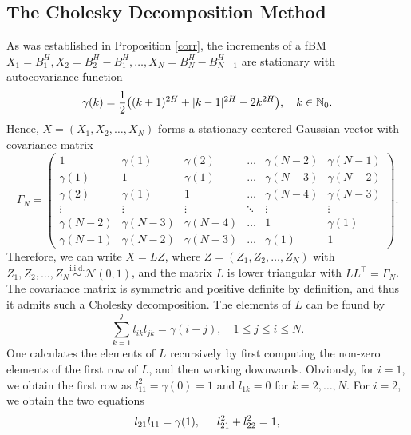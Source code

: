 \subsection{The Cholesky Decomposition Method}
As was established in Proposition \ref{corr}, the increments of a fBM $X_{1}=B_{1}^{H},X_{2}=B_{2}^{H}-B_{1}^{H}, \dots, X_{N}=B_{N}^{H}-B_{N-1}^{H}$ are stationary with autocovariance function
\begin{equation}
    \gamma(k)=\frac{1}{2}\left((k+1)^{2H}+|k-1|^{2H}-2k^{2H}\right), \quad k\in\N_{0}.
\end{equation}
Hence, $X=(X_{1}, X_{2},\dots,X_{N})$ forms a stationary centered Gaussian vector with covariance matrix
\begin{equation}
    \Gamma_{N}=\begin{pmatrix}
        1 & \gamma(1) & \gamma(2) & \dots & \gamma(N-2) & \gamma(N-1)\\
        \gamma(1) & 1 & \gamma(1) & \dots & \gamma(N-3) &  \gamma(N-2)\\
        \gamma(2) & \gamma(1) & 1 & \dots & \gamma(N-4) & \gamma(N-3)\\
        \vdots & \vdots & \vdots & \ddots & \vdots & \vdots\\
        \gamma(N-2) & \gamma(N-3) & \gamma(N-4) & \dots & 1 & \gamma(1)\\
        \gamma(N-1) & \gamma(N-2) & \gamma(N-3) & \dots & \gamma(1) & 1
    \end{pmatrix}.
\end{equation}
Therefore, we can write $X=LZ$, where $Z=(Z_{1},Z_{2},\dots, Z_{N})$ with $Z_{1},Z_{2},\dots, Z_{N}\overset{\textrm{i.i.d.}}{\sim} \mathcal{N}(0,1)$, and the matrix $L$ is lower triangular with $LL^{\top}=\Gamma_{N}$. The covariance matrix is symmetric and positive definite by definition, and thus it admits such a Cholesky decomposition. The elements of $L$ can be found by 
\begin{equation}
    \sum_{k=1}^{j}l_{ik}l_{jk}=\gamma(i-j), \quad 1\leq j\leq i\leq N.
\end{equation}
One calculates the elements of $L$ recursively by first computing the non-zero elements of the first row of $L$, and then working downwards. Obviously, for $i=1$, we obtain the first row as $l_{11}^{2}=\gamma(0)=1$ and $l_{1k}=0$ for $k=2,\dots,N$. For $i=2$, we obtain the two equations
\begin{align*}
    l_{21}l_{11}=\gamma(1), \hspace{15 pt} l_{21}^{2}+l_{22}^{2}=1,
\end{align*}

